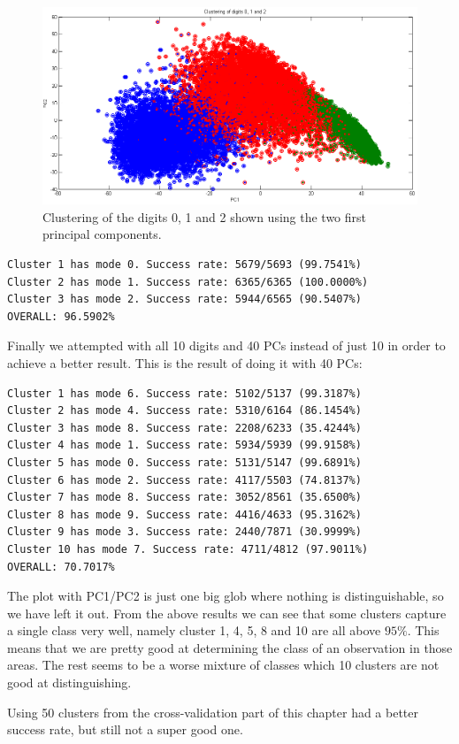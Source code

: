 \begin{figure}[H]
\centering
\includegraphics[width=1\linewidth]{code/gmm_0-2}
\caption{Clustering of the digits 0, 1 and 2 shown using the two first principal components.}
\label{fig:gmm_0-2}
\end{figure}

\begin{verbatim}
Cluster 1 has mode 0. Success rate: 5679/5693 (99.7541%)
Cluster 2 has mode 1. Success rate: 6365/6365 (100.0000%)
Cluster 3 has mode 2. Success rate: 5944/6565 (90.5407%)
OVERALL: 96.5902%
\end{verbatim}

\vspace{1cm}

Finally we attempted with all 10 digits and 40 PCs instead of just 10 in order to achieve a better result. This is the result of doing it with 40 PCs:

\begin{verbatim}
Cluster 1 has mode 6. Success rate: 5102/5137 (99.3187%)
Cluster 2 has mode 4. Success rate: 5310/6164 (86.1454%)
Cluster 3 has mode 8. Success rate: 2208/6233 (35.4244%)
Cluster 4 has mode 1. Success rate: 5934/5939 (99.9158%)
Cluster 5 has mode 0. Success rate: 5131/5147 (99.6891%)
Cluster 6 has mode 2. Success rate: 4117/5503 (74.8137%)
Cluster 7 has mode 8. Success rate: 3052/8561 (35.6500%)
Cluster 8 has mode 9. Success rate: 4416/4633 (95.3162%)
Cluster 9 has mode 3. Success rate: 2440/7871 (30.9999%)
Cluster 10 has mode 7. Success rate: 4711/4812 (97.9011%)
OVERALL: 70.7017%
\end{verbatim}

The plot with PC1/PC2 is just one big glob where nothing is distinguishable, so we have left it out. From the above results we can see that some clusters capture a single class very well, namely cluster 1, 4, 5, 8 and 10 are all above $95\%$. This means that we are pretty good at determining the class of an observation in those areas. The rest seems to be a worse mixture of classes which 10 clusters are not good at distinguishing.

Using 50 clusters from the cross-validation part of this chapter had a better success rate, but still not a super good one.
